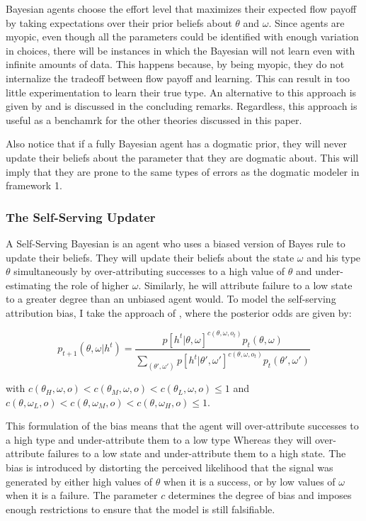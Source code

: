 \documentclass[
  12pt,
]{article}
\begin{document}
Bayesian agents choose the effort level that maximizes their expected
flow payoff by taking expectations over their prior beliefs about
\(\theta\) and \(\omega\). Since agents are myopic, even though all the
parameters could be identified with enough variation in choices, there
will be instances in which the Bayesian will not learn even with
infinite amounts of data. This happens because, by being myopic, they do
not internalize the tradeoff between flow payoff and learning. This can
result in too little experimentation to learn their true type. An
alternative to this approach is given by \citet{Hestermann2021} and is
discussed in the concluding remarks. Regardless, this approach is useful
as a benchamrk for the other theories discussed in this paper.

Also notice that if a fully Bayesian agent has a dogmatic prior, they
will never update their beliefs about the parameter that they are
dogmatic about. This will imply that they are prone to the same types of
errors as the dogmatic modeler in framework 1.

\hypertarget{the-self-serving-updater}{%
\subsubsection{The Self-Serving
Updater}\label{the-self-serving-updater}}

A Self-Serving Bayesian is an agent who uses a biased version of Bayes
rule to update their beliefs. They will update their beliefs about the
state \(\omega\) and his type \(\theta\) simultaneously by
over-attributing successes to a high value of \(\theta\) and
under-estimating the role of higher \(\omega\). Similarly, he will
attribute failure to a low state to a greater degree than an unbiased
agent would. To model the self-serving attribution bias, I take the
approach of \citet{benjamin2019}, where the posterior odds are given by:

\[
p_{t+1}(\theta, \omega| h^t) = \frac{p[h^t|\theta, \omega]^{c(\theta, \omega, o_t)}p_t(\theta, \omega)}{\sum_{(\theta', \omega')}p[h^t|\theta', \omega']^{c(\theta, \omega, o_t)}p_t(\theta', \omega')}
\]

with
\(c(\theta_H, \omega, o)<c(\theta_M, \omega, o)<c(\theta_L, \omega, o)\leq 1\)
and
\(c(\theta, \omega_L, o)<c(\theta, \omega_M, o)<c(\theta, \omega_H, o)\leq 1\).

This formulation of the bias means that the agent will over-attribute
successes to a high type and under-attribute them to a low type Whereas
they will over-attribute failures to a low state and under-attribute
them to a high state. The bias is introduced by distorting the perceived
likelihood that the signal was generated by either high values of
\(\theta\) when it is a success, or by low values of \(\omega\) when it
is a failure. The parameter \(c\) determines the degree of bias and
imposes enough restrictions to ensure that the model is still
falsifiable.
\end{document}
